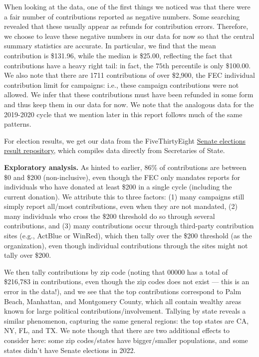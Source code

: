 \documentclass[11pt]{article}
\begin{document}
When looking at the data, one of the first things we noticed was that there were a fair number of contributions reported as negative numbers. Some searching revealed that these usually appear as refunds for contribution errors. Therefore, we choose to leave these negative numbers in our data for now so that the central summary statistics are accurate. In particular, we find that the mean contribution is \$131.96, while the median is \$25.00, reflecting the fact that contributions have a heavy right tail: in fact, the $75$th percentile is only \$100.00. We also note that there are 1711 contributions of over \$2,900, the FEC individual contribution limit for campaigns: i.e., these campaign contributions were not allowed. We infer that these contributions must have been refunded in some form and thus keep them in our data for now. We note that the analogous data for the 2019-2020 cycle that we mention later in this report follows much of the same patterns.

For election results, we get our data from the FiveThirtyEight \href{https://github.com/fivethirtyeight/election-results/tree/main}{Senate elections result repository}, which compiles data directly from Secretaries of State.

\textbf{Exploratory analysis.} As hinted to earlier, 86\% of contributions are between \$0 and \$200 (non-inclusive), even though the FEC only mandates reports for individuals who have donated at least \$200 in a single cycle (including the current donation). We attribute this to three factors: (1) many campaigns still simply report all/most contributions, even when they are not mandated, (2) many individuals who cross the \$200 threshold do so through several contributions, and (3) many contributions occur through third-party contribution sites (e.g., ActBlue or WinRed), which then tally over the \$200 threshold (as the organization), even though individual contributions through the sites might not tally over \$200. 

We then tally contributions by zip code (noting that 00000 has a total of \$216,783 in contributions, even though the zip codes does not exist --- this is an error in the data!), and we see that the top contributions correspond to Palm Beach, Manhattan, and Montgomery County, which all contain wealthy areas known for large political contributions/involvement. Tallying by state reveals a similar phenomenon, capturing the same general regions: the top states are CA, NY, FL, and TX. We note though that there are two additional effects to consider here: some zip codes/states have bigger/smaller populations, and some states didn't have Senate elections in 2022. 
\end{document}

